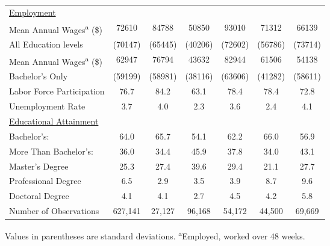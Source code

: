 \documentclass[11pt]{article}
\theoremstyle{definition}
\begin{document}
{\begin{center}
\begin{tabular}{l c c c c c c}
\underline{Employment} & & & & & & \\
Mean Annual Wages\textsuperscript{a} (\$) & 72610 & 84788 & 50850 & 93010 & 71312 & 66139 \\
\hspace{2.5mm}All Education levels & (70147) & (65445) & (40206) & (72602) & (56786) & (73714) \\
Mean Annual Wages\textsuperscript{a} (\$) & 62947 & 76794 & 43632 & 82944 & 61506 & 54138 \\
\hspace{2.5mm}Bachelor's Only & (59199) & (58981) & (38116) & (63606) & (41282) & (58611) \\
Labor Force Participation & 76.7 & 84.2 & 63.1 & 78.4 & 78.4 & 72.8 \\
Unemployment Rate & 3.7 & 4.0 & 2.3 & 3.6 & 2.4 & 4.1 \\
\underline{Educational Attainment}  &  &  &  &  &  &  \\
Bachelor's:  & 64.0 & 65.7 & 54.1 & 62.2 & 66.0 & 56.9 \\
More Than Bachelor's:  & 36.0 & 34.4 & 45.9 & 37.8 & 34.0 & 43.1 \\
\hspace{2.5mm}Master's Degree & 25.3 & 27.4 & 39.6 & 29.4 & 21.1 & 27.7 \\
\hspace{2.5mm}Professional Degree & 6.5 & 2.9 & 3.5 & 3.9 & 8.7 & 9.6 \\
\hspace{2.5mm}Doctoral Degree & 4.1 & 4.1 & 2.7 & 4.5 & 4.2 & 5.8 \\
\hline
Number of Observations & 627,141 & 27,127 & 96,168 & 54,172 & 44,500 & 69,669 \\
\hline\hline
\end{tabular} 
\end{center}} 
\small{Values in parentheses are standard deviations. \textsuperscript{a}Employed, worked over 48 weeks.}
\end{document}
